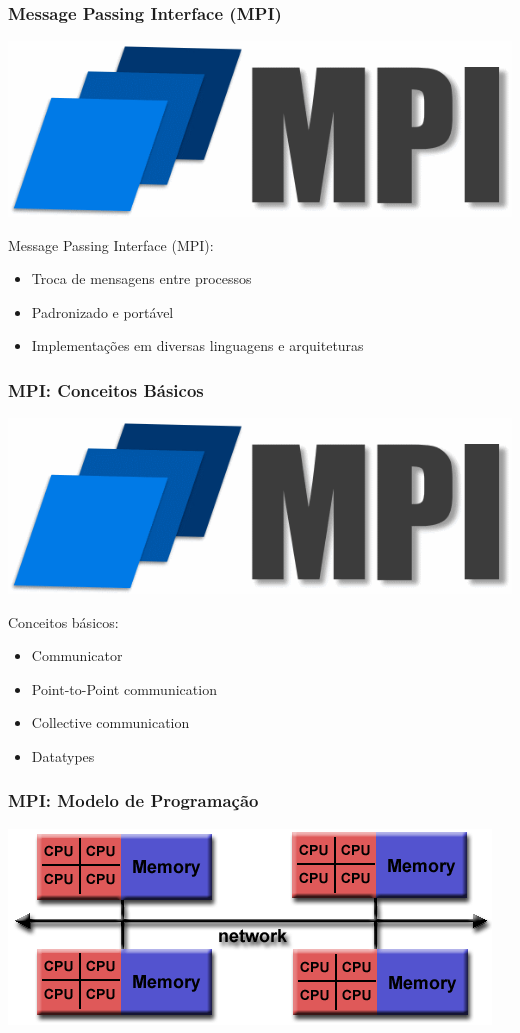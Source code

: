 \documentclass[12pt, compress, aspectratio=169, xcolor={table,usenames,dvipsnames}]{beamer}
\begin{document}
\begin{frame}
    \frametitle{Message Passing Interface (MPI)}
    \begin{center}
        \includegraphics[width=.3\textwidth]{mpi-logo}
    \end{center}

    Message Passing Interface (\alert{MPI}):

    \begin{itemize}
        \item \alert{Troca de mensagens} entre \alert{processos}
        \item \alert{Padronizado} e \alert{portável}
        \item Implementações em diversas \alert{linguagens} e
            \alert{arquiteturas}
    \end{itemize}
\end{frame}

\begin{frame}
    \frametitle{MPI: Conceitos Básicos}
    \begin{center}
        \includegraphics[width=.3\textwidth]{mpi-logo}
    \end{center}

    Conceitos básicos:

    \begin{itemize}
        \item \alert{Communicator}
        \item \alert{Point-to-Point} communication
        \item \alert{Collective} communication
        \item \alert{Datatypes}
    \end{itemize}
\end{frame}

\begin{frame}
    \frametitle{MPI: Modelo de Programação}
    \begin{center}
        \includegraphics[width=.6\textwidth]{hybrid-mem}
    \end{center}
\end{frame}
\end{document}
